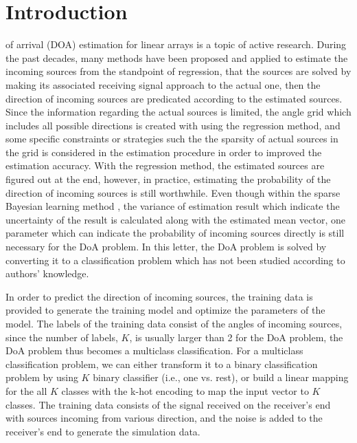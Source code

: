 \documentclass[journal]{IEEEtran}
\begin{document}
\IEEEpeerreviewmaketitle

\section{Introduction} 
 of arrival (DOA) estimation for linear arrays is a topic of active research. During the past decades, many methods have been proposed and applied to estimate the incoming sources from the standpoint of regression, that the sources are solved by making its associated receiving signal approach to the actual one, then the direction of incoming sources are predicated according to the estimated sources.
Since the information regarding the actual sources is limited, the angle grid which includes all possible directions is created with using the regression method, and some specific constraints or strategies such the the sparsity of actual sources in the grid \cite{BCS_4} is considered in the estimation procedure in order to improved the estimation accuracy. 
With the regression method, the estimated sources are figured out at the end, however, in practice, estimating the probability of the direction of incoming sources is still worthwhile. Even though within the sparse Bayesian learning method \cite{BCS_tipping}, the variance of estimation result which indicate the uncertainty of the result is calculated along with the estimated mean vector, one parameter which can indicate the probability of incoming sources directly is still necessary for the DoA problem. 
In this letter, the DoA problem is solved by converting it to a classification problem which has not been studied according to authors' knowledge.

In order to predict the direction of incoming sources, the training data is provided to generate the training model and optimize the parameters of the model. The labels of the training data consist of the angles of incoming sources, since the number of labels, $K$, is usually larger than 2 for the DoA problem, the DoA problem thus becomes a multiclass classification.
For a multiclass classification problem, we can either transform it to a binary classification problem by using $K$ binary classifier (i.e., one vs. rest), or build a linear mapping for the all $K$ classes with the k-hot encoding to map the input vector to $K$ classes. 
The training data consists of the signal received on the receiver's end with sources incoming from various direction, and the noise is added to the receiver's end to generate the simulation data.
 
\end{document}
